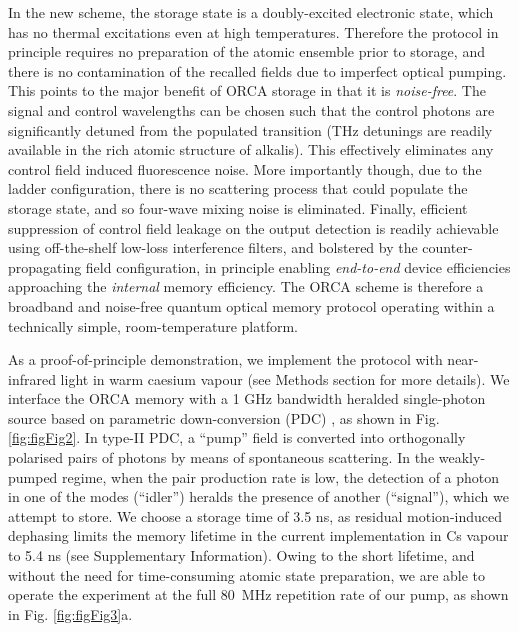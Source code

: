 \documentclass[12pt]{iopart}
\begin{document}
In the new scheme, the storage state is a doubly-excited electronic state, which has no thermal excitations even at high temperatures. Therefore the protocol in principle requires no preparation of the atomic ensemble prior to storage, and there is no contamination of the recalled fields due to imperfect optical pumping. This points to the major benefit of ORCA storage in that it is {\it noise-free}. The signal and control wavelengths can be chosen such that the control photons are significantly detuned from the populated transition (THz detunings are readily available in the rich atomic structure of alkalis). This effectively eliminates any control field induced fluorescence noise. More importantly though, due to the ladder configuration, there is no scattering process that could populate the storage state, and so four-wave mixing noise is eliminated. Finally, efficient suppression of control field leakage on the output detection is readily achievable using off-the-shelf low-loss interference filters, and bolstered by the counter-propagating field configuration, in principle enabling \emph{end-to-end} device efficiencies approaching the \emph{internal} memory efficiency. The ORCA scheme is therefore a broadband and noise-free quantum optical memory protocol operating within a technically simple, room-temperature platform.

As a proof-of-principle demonstration, we implement the protocol with near-infrared light in warm caesium vapour (see Methods section for more details). We interface the ORCA memory with a 1 GHz bandwidth heralded single-photon source based on parametric down-conversion (PDC) \cite{Michelberger2015}, as shown in Fig. \ref{fig:figFig2}. In type-II PDC, a ``pump'' field is converted into orthogonally polarised pairs of photons by means of spontaneous scattering. In the weakly-pumped regime, when the pair production rate is low, the detection of a photon in one of the modes (``idler'') heralds the presence of another (``signal''), which we attempt to store.  We choose a storage time of 3.5 ns, as residual motion-induced dephasing limits the memory lifetime in the current implementation in Cs vapour to 5.4 ns (see Supplementary Information). Owing to the short lifetime, and without the need for time-consuming atomic state preparation, we are able to operate the experiment at the full 80~MHz repetition rate of our pump, as shown in Fig. \ref{fig:figFig3}a.
\end{document}

